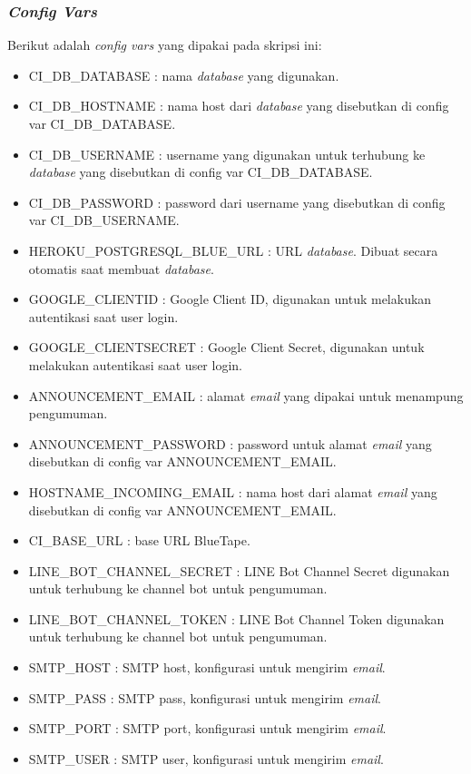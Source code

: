 	\subsubsection{\textit{Config Vars}}
			Berikut adalah \textit{config vars} yang dipakai pada skripsi ini: 
		\begin{itemize}
			\item CI\_DB\_DATABASE : nama \textit{database} yang digunakan.
			\item CI\_DB\_HOSTNAME : nama host dari \textit{database} yang disebutkan di config var CI\_DB\_DATABASE.
			\item CI\_DB\_USERNAME : username yang digunakan untuk terhubung ke \textit{database} yang disebutkan di config var CI\_DB\_DATABASE.
			\item CI\_DB\_PASSWORD : password dari username yang disebutkan di config var CI\_DB\_USERNAME.
			\item HEROKU\_POSTGRESQL\_BLUE\_URL : URL \textit{database}. Dibuat secara otomatis saat membuat \textit{database}.
			\item GOOGLE\_CLIENTID : Google Client ID, digunakan untuk melakukan autentikasi saat user login.
			\item GOOGLE\_CLIENTSECRET : Google Client Secret, digunakan untuk melakukan autentikasi saat user login.
			\item ANNOUNCEMENT\_EMAIL : alamat \textit{email} yang dipakai untuk menampung pengumuman.
			\item ANNOUNCEMENT\_PASSWORD : password untuk alamat \textit{email} yang disebutkan di config var ANNOUNCEMENT\_EMAIL.
			\item HOSTNAME\_INCOMING\_EMAIL : nama host dari alamat \textit{email} yang disebutkan di config var ANNOUNCEMENT\_EMAIL.
			\item CI\_BASE\_URL : base URL BlueTape.
			\item LINE\_BOT\_CHANNEL\_SECRET : LINE Bot Channel Secret digunakan untuk terhubung ke channel bot untuk pengumuman.
			\item LINE\_BOT\_CHANNEL\_TOKEN : LINE Bot Channel Token digunakan untuk terhubung ke channel bot untuk pengumuman.
			\item SMTP\_HOST : SMTP host, konfigurasi untuk mengirim \textit{email}.
			\item SMTP\_PASS : SMTP pass, konfigurasi untuk mengirim \textit{email}.
			\item SMTP\_PORT : SMTP port, konfigurasi untuk mengirim \textit{email}.
			\item SMTP\_USER : SMTP user, konfigurasi untuk mengirim \textit{email}.
		\end{itemize}
		
